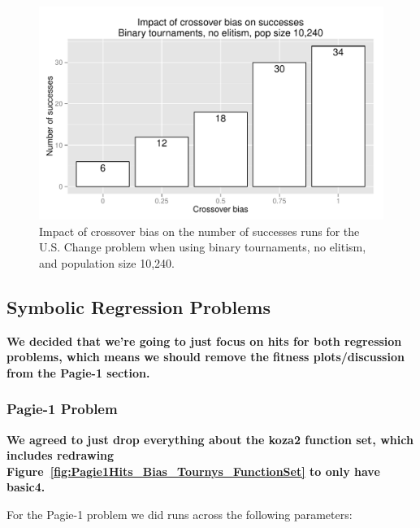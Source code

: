 \documentclass{sig-alternate}
\begin{document}
\begin{figure}
\centering
\includegraphics[width=0.45 \textwidth]{Plots/US_change_successes_strong.pdf}
\caption{Impact of crossover bias on the number of successes runs for the U.S. Change problem when using binary
tournaments, no elitism, and population size 10,240.}
\label{fig:USChange_Successes_strong}
\end{figure}

%
%
%
%


\subsection{Symbolic Regression Problems}

\textbf{We decided that we're going to just focus on hits for both regression problems, which means we should remove the fitness plots/discussion from the Pagie-1 section.}

\subsubsection{Pagie-1 Problem}

\textbf{We agreed to just drop everything about the koza2 function set, which includes redrawing Figure~\ref{fig:Pagie1Hits_Bias_Tournys_FunctionSet} to only have basic4.}

For the Pagie-1 problem we did runs across the following parameters:
\end{document}
